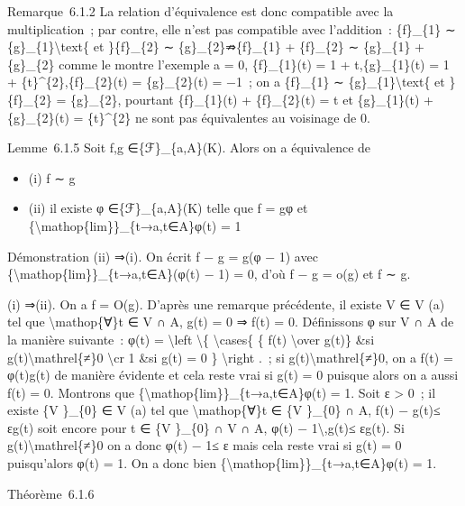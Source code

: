 \documentclass[]{article}
\begin{document}
Remarque~6.1.2 La relation d'équivalence est donc compatible avec la
multiplication~; par contre, elle n'est pas compatible avec l'addition~:
\{f\}\_\{1\} ∼ \{g\}\_\{1\}\textbackslash{}text\{ et \}\{f\}\_\{2\} ∼
\{g\}\_\{2\}⇏\{f\}\_\{1\} + \{f\}\_\{2\} ∼ \{g\}\_\{1\} + \{g\}\_\{2\}
comme le montre l'exemple a = 0, \{f\}\_\{1\}(t) = 1 + t,\{g\}\_\{1\}(t)
= 1 + \{t\}\^{}\{2\},\{f\}\_\{2\}(t) = \{g\}\_\{2\}(t) = −1~; on a
\{f\}\_\{1\} ∼ \{g\}\_\{1\}\textbackslash{}text\{ et \}\{f\}\_\{2\} =
\{g\}\_\{2\}, pourtant \{f\}\_\{1\}(t) + \{f\}\_\{2\}(t) = t et
\{g\}\_\{1\}(t) + \{g\}\_\{2\}(t) = \{t\}\^{}\{2\} ne sont pas
équivalentes au voisinage de 0.

Lemme~6.1.5 Soit f,g ∈\{ℱ\}\_\{a,A\}(K). Alors on a équivalence de

\begin{itemize}
\itemsep1pt\parskip0pt
\item
  (i) f ∼ g
\item
  (ii) il existe φ ∈\{ℱ\}\_\{a,A\}(K) telle que f = gφ et
  \{\textbackslash{}mathop\{lim\}\}\_\{t→a,t∈A\}φ(t) = 1
\end{itemize}

Démonstration (ii) ⇒(i). On écrit f − g = g(φ − 1) avec
\{\textbackslash{}mathop\{lim\}\}\_\{t→a,t∈A\}(φ(t) − 1) = 0, d'où f − g
= o(g) et f ∼ g.

(i) ⇒(ii). On a f = O(g). D'après une remarque précédente, il existe V ∈
V (a) tel que \textbackslash{}mathop\{∀\}t ∈ V ∩ A, g(t) = 0 ⇒ f(t) = 0.
Définissons φ sur V ∩ A de la manière suivante~: φ(t) =
\textbackslash{}left \textbackslash{}\{ \textbackslash{}cases\{ \{ f(t)
\textbackslash{}over g(t)\} \&si g(t)\textbackslash{}mathrel\{≠\}0
\textbackslash{}cr 1 \&si g(t) = 0 \} \textbackslash{}right .~; si
g(t)\textbackslash{}mathrel\{≠\}0, on a f(t) = φ(t)g(t) de manière
évidente et cela reste vrai si g(t) = 0 puisque alors on a aussi f(t) =
0. Montrons que \{\textbackslash{}mathop\{lim\}\}\_\{t→a,t∈A\}φ(t) = 1.
Soit ε \textgreater{} 0~; il existe \{V \}\_\{0\} ∈ V (a) tel que
\textbackslash{}mathop\{∀\}t ∈ \{V \}\_\{0\} ∩ A, \textbar{}f(t) −
g(t)\textbar{}≤ ε\textbar{}g(t)\textbar{} soit encore pour t ∈ \{V
\}\_\{0\} ∩ V ∩ A, \textbar{}φ(t) −
1\textbar{}\textbackslash{},\textbar{}g(t)\textbar{}≤
ε\textbar{}g(t)\textbar{}. Si g(t)\textbackslash{}mathrel\{≠\}0 on a
donc \textbar{}φ(t) − 1\textbar{}≤ ε mais cela reste vrai si g(t) = 0
puisqu'alors φ(t) = 1. On a donc bien
\{\textbackslash{}mathop\{lim\}\}\_\{t→a,t∈A\}φ(t) = 1.

Théorème~6.1.6
\end{document}
